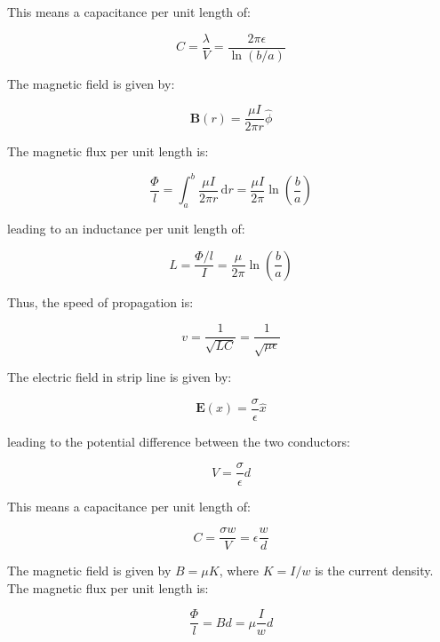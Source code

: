 \documentclass[12pt]{article}
\begin{document}
This means a capacitance per unit length of:

\begin{equation}
    C = \frac{\lambda}{V} = \frac{2\pi\epsilon}{\ln{(b/a)}}
\end{equation}

The magnetic field is given by:

\begin{equation}
    \mathbf{B}(r) = \frac{\mu I}{2\pi r} \hat{\phi}
\end{equation}

The magnetic flux per unit length is:

\begin{equation}
    \frac{\Phi}{l} = \int_{a}^{b} \frac{\mu I}{2\pi r} \, \mathrm{d}r = \frac{\mu I}{2\pi} \ln{\left( \frac{b}{a} \right)}
\end{equation}

leading to an inductance per unit length of:

\begin{equation}
    L = \frac{\Phi/l}{I} = \frac{\mu}{2\pi} \ln{\left( \frac{b}{a} \right)}
\end{equation}

Thus, the speed of propagation is:

\begin{equation}
    v = \frac{1}{\sqrt{LC}} = \frac{1}{\sqrt{\mu\epsilon}}
\end{equation}

The electric field in strip line is given by:

\begin{equation}
    \mathbf{E}(x) = \frac{\sigma}{\epsilon} \hat{x}
\end{equation}

leading to the potential difference between the two conductors:

\begin{equation}
    V = \frac{\sigma}{\epsilon} d
\end{equation}

This means a capacitance per unit length of:

\begin{equation}
    C = \frac{\sigma w}{V} = \epsilon \frac{w}{d}
\end{equation}

The magnetic field is given by $B = \mu K$, where $K = I/w$ is the current density. The magnetic flux per unit length is:

\begin{equation}
    \frac{\Phi}{l} = Bd = \mu \frac{I}{w} d
\end{equation}
\end{document}

